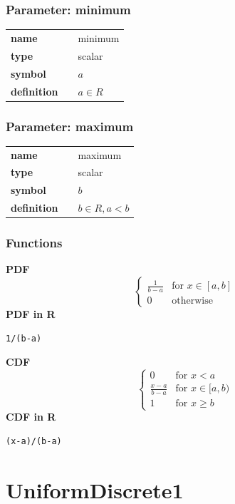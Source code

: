 \documentclass{article}
\begin{document}
\subsubsection*{Parameter: minimum}

\noindent\begin{tabular}{p{2cm}cl}
\textbf{name} & & minimum \\
\textbf{type} & & scalar \\
\textbf{symbol} & & $a$  \\
\textbf{definition} & & $a \in  R$
\end{tabular}
\subsubsection*{Parameter: maximum}

\noindent\begin{tabular}{p{2cm}cl}
\textbf{name} & & maximum \\
\textbf{type} & & scalar \\
\textbf{symbol} & & $b$  \\
\textbf{definition} & & $b \in R, a < b$
\end{tabular}
\subsubsection*{Functions}

\smallskip \noindent \hspace{.2cm} \textbf{PDF} 
\begin{equation*}\begin{cases}
                  \frac{1}{b - a} & \text{for } x \in [a,b]  \\
                  0               & \text{otherwise}
                \end{cases}\end{equation*}
\smallskip \noindent \hspace{.2cm} \textbf{PDF in R}  
\begin{verbatim}1/(b-a)\end{verbatim}
\smallskip \noindent \hspace{.2cm} \textbf{CDF} 
\begin{equation*}\begin{cases}
                  0               & \text{for } x < a \\
                  \frac{x-a}{b-a} & \text{for } x \in [a,b) \\
                  1               & \text{for } x \ge b
                \end{cases}\end{equation*}
\smallskip \noindent \hspace{.2cm} \textbf{CDF in R} 
\begin{verbatim}(x-a)/(b-a)\end{verbatim}
\smallskip\section*{UniformDiscrete1} 
\end{document}
